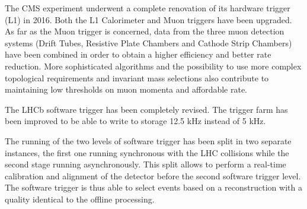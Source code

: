 The CMS experiment underwent a complete renovation of its hardware trigger (L1) in 2016.
Both the L1 Calorimeter and Muon triggers have been upgraded.
As far as the Muon trigger is concerned, data from the three muon detection systems (Drift Tubes, Resistive Plate Chambers and Cathode Strip Chambers) have been combined in order to obtain a higher efficiency and better rate reduction. 
More sophisticated algorithms and the possibility to use more complex topological requirements and invariant mass selections also contribute to maintaining low thresholds on muon momenta and affordable rate.

The LHCb software trigger has been completely revised. 
The trigger farm has been improved to be able to write to storage 12.5 kHz instead of 5 kHz.

The running of the two levels of software trigger has been split in two separate instances, 
the first one running synchronous with the LHC collisions while the second stage running asynchronously. 
This split allows to perform a real-time calibration and alignment of the detector before the second software trigger level.
The software trigger is thus able to select events based on a reconstruction with a quality identical to the offline processing.

%  